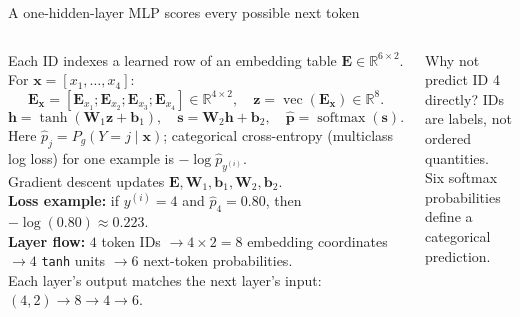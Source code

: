 \documentclass[aspectratio=169]{beamer}
\newcommand{\E}{\mathbf{E}}
\newcommand{\x}{\mathbf{x}}
\begin{document}
\begin{frame}{A one-hidden-layer MLP scores every possible next token}
\small
\begin{columns}[T]
\scriptsize
Each ID indexes a learned row of an embedding table $\E\in\mathbb R^{6\times2}$.\\[.35em]
For $\x=[x_1,\ldots,x_4]$:
\[
\E_{\x}=[\E_{x_1};\E_{x_2};\E_{x_3};\E_{x_4}]\in\mathbb R^{4\times2},
\quad \mathbf z=\operatorname{vec}(\E_{\x})\in\mathbb R^8.
\]
\[
\mathbf h=\tanh(\mathbf W_1\mathbf z+\mathbf b_1),
\quad \mathbf s=\mathbf W_2\mathbf h+\mathbf b_2,
\quad \hat{\mathbf p}=\operatorname{softmax}(\mathbf s).
\]
Here $\hat p_j=P_g(Y=j\mid\x)$; categorical cross-entropy (multiclass log loss) for one example is $-\log \hat p_{y^{(i)}}$.\\[.35em]
Gradient descent updates $\E,\mathbf W_1,\mathbf b_1,\mathbf W_2,\mathbf b_2$.\\[.35em]
\textbf{Loss example:} if $y^{(i)}=4$ and $\hat p_4=0.80$, then $-\log(0.80)\approx0.223$.\\[1em]
\textbf{Layer flow:} $4$ token IDs $\rightarrow 4\times2=8$ embedding coordinates $\rightarrow 4$ \texttt{tanh} units $\rightarrow 6$ next-token probabilities.\\[.35em]
Each layer's output matches the next layer's input: $(4,2)\rightarrow8\rightarrow4\rightarrow6$.
\centering
{}
\vspace{1em}
\begin{block}{Why not predict ID 4 directly?}
IDs are labels, not ordered quantities. Six softmax probabilities define a categorical prediction.
\end{block}
\end{columns}
\end{frame}
\end{document}
